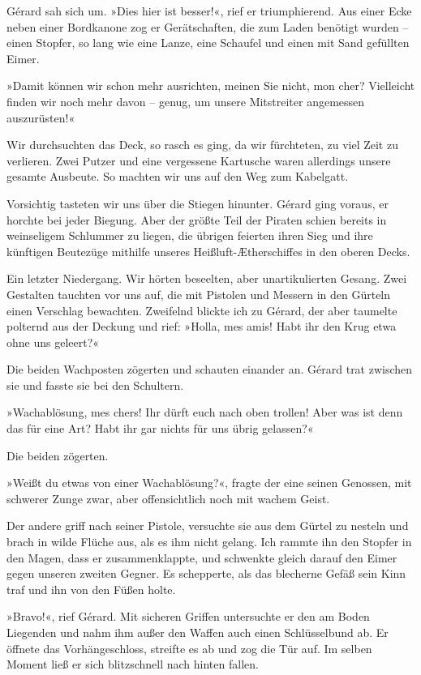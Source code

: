 Gérard sah sich um. »Dies hier ist besser!«, rief er triumphierend.
Aus einer Ecke neben einer Bordkanone zog er Gerätschaften, die zum
Laden benötigt wurden – einen Stopfer, so lang wie eine Lanze, eine
Schaufel und einen mit Sand gefüllten Eimer.

»Damit können wir schon mehr ausrichten, meinen Sie nicht, mon
cher? Vielleicht finden wir noch mehr davon – genug, um unsere
Mitstreiter angemessen auszurüsten!«

Wir durchsuchten das Deck, so rasch es ging, da wir fürchteten, zu
viel Zeit zu verlieren. Zwei Putzer und eine vergessene Kartusche
waren allerdings unsere gesamte Ausbeute. So machten wir uns auf
den Weg zum Kabelgatt.

\bigpar

Vorsichtig tasteten wir uns über die Stiegen hinunter. Gérard ging
voraus, er horchte bei jeder Biegung. Aber der größte Teil der
Piraten schien bereits in weinseligem Schlummer zu liegen, die
übrigen feierten ihren Sieg und ihre künftigen Beutezüge mithilfe
unseres Heißluft-Ætherschiffes in den oberen Decks.

Ein letzter Niedergang. Wir hörten beseelten, aber unartikulierten
Gesang. Zwei Gestalten tauchten vor uns auf, die mit Pistolen und
Messern in den Gürteln einen Verschlag bewachten. Zweifelnd blickte
ich zu Gérard, der aber taumelte polternd aus der Deckung und rief:
»Holla, mes amis! Habt ihr den Krug etwa ohne uns geleert?«

Die beiden Wachposten zögerten und schauten einander an. Gérard
trat zwischen sie und fasste sie bei den Schultern.

»Wachablösung, mes chers! Ihr dürft euch nach oben trollen! Aber
was ist denn das für eine Art? Habt ihr gar nichts für uns übrig
gelassen?«

Die beiden zögerten.

»Weißt du etwas von einer Wachablösung?«, fragte der eine seinen
Genossen, mit schwerer Zunge zwar, aber offensichtlich noch mit
wachem Geist.

Der andere griff nach seiner Pistole, versuchte sie aus dem Gürtel
zu nesteln und brach in wilde Flüche aus, als es ihm nicht gelang.
Ich rammte ihn den Stopfer in den Magen, dass er zusammenklappte,
und schwenkte gleich darauf den Eimer gegen unseren zweiten Gegner.
Es schepperte, als das blecherne Gefäß sein Kinn traf und ihn von
den Füßen holte.

»Bravo!«, rief Gérard. Mit sicheren Griffen untersuchte er den am
Boden Liegenden und nahm ihm außer den Waffen auch einen
Schlüsselbund ab. Er öffnete das Vorhängeschloss, streifte es ab
und zog die Tür auf. Im selben Moment ließ er sich blitzschnell
nach hinten fallen.

